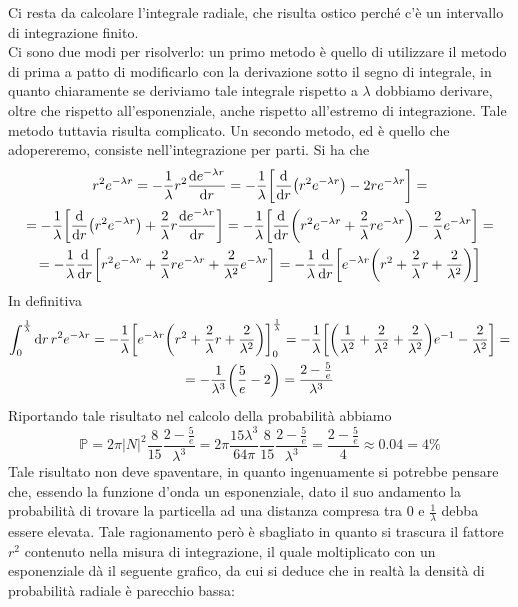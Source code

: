 \begin{soluzione}
   Ci resta da calcolare l'integrale radiale, che risulta ostico perché c'è un intervallo di integrazione finito.\\
   Ci sono due modi per risolverlo: un primo metodo è quello di utilizzare il metodo di prima a patto di modificarlo con la derivazione sotto il segno di integrale, in quanto chiaramente se deriviamo tale integrale rispetto a $\lambda$ dobbiamo derivare, oltre che rispetto all'esponenziale, anche rispetto all'estremo di integrazione. Tale metodo tuttavia risulta complicato. Un secondo metodo, ed è quello che adopereremo, consiste nell'integrazione per parti. Si ha che
   \begin{gather*}
      r^2 e^{-\lambda r}
      =-\frac{1}{\lambda} r^2 \dv{e^{-\lambda r}}{r}
      =-\frac{1}{\lambda} \qty[ \dv{r} \qty( r^2 e^{-\lambda r} ) - 2re^{-\lambda r} ]=
      \\
      =-\frac{1}{\lambda} \qty[ \dv{r} \qty( r^2 e^{-\lambda r} ) + \frac{2}{\lambda} r \dv{e^{-\lambda r}}{r} ]
      =-\frac{1}{\lambda} \qty[ \dv{r} \qty( r^2 e^{-\lambda r} + \frac{2}{\lambda} r e^{-\lambda r} ) - \frac{2}{\lambda} e^{-\lambda r} ]=
      \\
      =-\frac{1}{\lambda} \dv{r} \qty[ r^2 e^{-\lambda r} + \frac{2}{\lambda} r e^{-\lambda r} + \frac{2}{\lambda^2} e^{-\lambda r} ]
      =-\frac{1}{\lambda} \dv{r} \qty[ e^{-\lambda r} \qty( r^2 + \frac{2}{\lambda} r + \frac{2}{\lambda^2} ) ]
   \end{gather*}
   In definitiva
   \begin{gather*}
      \int_{0}^{\frac{1}{\lambda}} \dd{r} r^2 e^{-\lambda r}
      =-\frac{1}{\lambda} \qty[ e^{-\lambda r} \qty( r^2 + \frac{2}{\lambda} r + \frac{2}{\lambda^2} ) ]_{0}^{\frac{1}{\lambda}}
      =-\frac{1}{\lambda} \qty[ \qty( \frac{1}{\lambda^2} + \frac{2}{\lambda^2} + \frac{2}{\lambda^2} ) e^{-1} - \frac{2}{\lambda^2} ]=
      \\
      =-\frac{1}{\lambda^3} \qty( \frac{5}{e} - 2 )
      =\frac{2 - \frac{5}{e}}{\lambda^3}
   \end{gather*}
   Riportando tale risultato nel calcolo della probabilità abbiamo
   \begin{equation*}
      \mathbb{P}
      =2\pi |N|^2 \frac{8}{15} \frac{2 - \frac{5}{e}}{\lambda^3}
      =2\pi \frac{15\lambda^3}{64 \pi} \frac{8}{15} \frac{2 - \frac{5}{e}}{\lambda^3}
      =\frac{2 - \frac{5}{e}}{4}
      \approx 0.04
      =4 \%
   \end{equation*}
   Tale risultato non deve spaventare, in quanto ingenuamente si potrebbe pensare che, essendo la funzione d'onda un esponenziale, dato il suo andamento la probabilità di trovare la particella ad una distanza compresa tra $0$ e $\frac{1}{\lambda}$ debba essere elevata. Tale ragionamento però è sbagliato in quanto si trascura il fattore $r^2$ contenuto nella misura di integrazione, il quale moltiplicato con un esponenziale dà il seguente grafico, da cui si deduce che in realtà la densità di probabilità radiale è parecchio bassa:

\end{soluzione}

